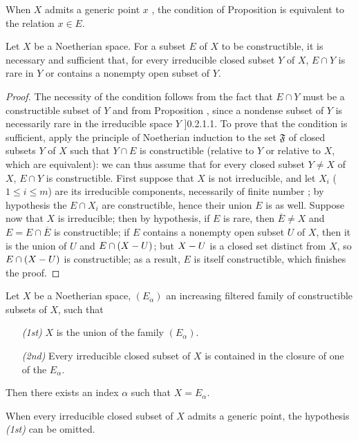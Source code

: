 When $X$ admits a generic point $x$ , the condition of Proposition  is equivalent to the relation $x\in E$.

\begin{proposition}[9.2.3]
\label{0.9.2.3}
Let $X$ be a Noetherian space.
For a subset $E$ of $X$ to be constructible, it is necessary and sufficient that, for every irreducible closed subset $Y$ of $X$, $E\cap Y$ is rare in $Y$ or contains a nonempty open subset of $Y$.
\end{proposition}

\begin{proof}
The necessity of the condition follows from the fact that $E\cap Y$ must be a constructible subset of $Y$ and from Proposition , since a nondense subset of $Y$ is necessarily rare in the irreducible space $Y$ \sref[0]]{0.2.1.1}.
To prove that the condition is sufficient, apply the principle of Noetherian induction  to the set $\mathfrak{F}$ of closed subsets $Y$ of $X$ such that $Y\cap E$ is constructible (relative to $Y$ or relative to $X$, which are equivalent): we can thus assume that for every closed subset $Y\neq X$ of $X$, $E\cap Y$ is constructible.
First suppose that $X$ is not irreducible, and let $X_i$ ($1\leq i\leq m$) are its irreducible components, necessarily of finite number ; by hypothesis the $E\cap X_i$ are constructible, hence their union $E$ is as well.
Suppose now that $X$ is irreducible; then by hypothesis, if $E$ is rare, then $\overline{E}\neq X$ and $E=E\cap\overline{E}$ is constructible; if $E$ contains a nonempty open subset $U$ of $X$, then it is the union of $U$ and $E\cap(X- U)$; but $X- U$ is a closed set distinct from $X$, so $E\cap(X- U)$ is constructible; as a result, $E$ is itself constructible, which finishes the proof.
\end{proof}

\begin{corollary}[9.2.4]
\label{0.9.2.4}
Let $X$ be a Noetherian space, $(E_\alpha)$ an increasing filtered family of constructible subsets of $X$, such that
\begin{enumerate}
  \item[\emph{(1st)}] $X$ is the union of the family $(E_\alpha)$.
  \item[\emph{(2nd)}] Every irreducible closed subset of $X$ is contained in the closure of one of the $E_\alpha$.
\end{enumerate}

Then there exists an index $\alpha$ such that $X=E_\alpha$.

When every irreducible closed subset of $X$ admits a generic point, the hypothesis \emph{(1st)} can be omitted.
\end{corollary}

